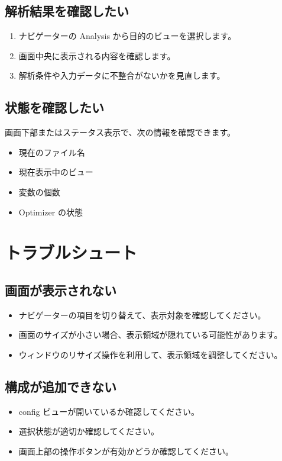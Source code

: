 \documentclass[11pt]{article}
\begin{document}
\subsection{解析結果を確認したい}
\begin{enumerate}
  \item ナビゲーターの Analysis から目的のビューを選択します。
  \item 画面中央に表示される内容を確認します。
  \item 解析条件や入力データに不整合がないかを見直します。
\end{enumerate}

\subsection{状態を確認したい}
画面下部またはステータス表示で、次の情報を確認できます。
\begin{itemize}
  \item 現在のファイル名
  \item 現在表示中のビュー
  \item 変数の個数
  \item Optimizer の状態
\end{itemize}

\section{トラブルシュート}
\subsection{画面が表示されない}
\begin{itemize}
  \item ナビゲーターの項目を切り替えて、表示対象を確認してください。
  \item 画面のサイズが小さい場合、表示領域が隠れている可能性があります。
  \item ウィンドウのリサイズ操作を利用して、表示領域を調整してください。
\end{itemize}

\subsection{構成が追加できない}
\begin{itemize}
  \item config ビューが開いているか確認してください。
  \item 選択状態が適切か確認してください。
  \item 画面上部の操作ボタンが有効かどうか確認してください。
\end{itemize}
\end{document}
